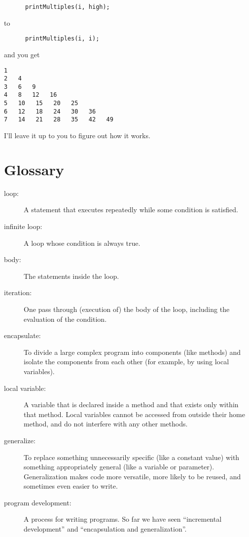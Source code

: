 \documentclass[12pt]{book}
\theoremstyle{definition}
\begin{document}
\begin{lstlisting}
      printMultiples(i, high);
\end{lstlisting}
%
to

\begin{lstlisting}
      printMultiples(i, i);
\end{lstlisting}
%
and you get

\begin{lstlisting}
1   
2   4   
3   6   9   
4   8   12   16   
5   10   15   20   25   
6   12   18   24   30   36   
7   14   21   28   35   42   49  
\end{lstlisting}
%
I'll leave it up to you to figure out how it works.


\section{Glossary}

\begin{description}

\item[loop:]  A statement that executes repeatedly while
some condition is satisfied.

\item[infinite loop:]  A loop whose condition is always true.

\item[body:]  The statements inside the loop.

\item[iteration:]  One pass through (execution of) the body
of the loop, including the evaluation of the condition.

\item[encapsulate:]  To divide a large complex program into
components (like methods) and isolate the components from
each other (for example, by using local variables).

\item[local variable:]  A variable that is declared inside
a method and that exists only within that method.  Local variables
cannot be accessed from outside their home method, and do not
interfere with any other methods.

\item[generalize:]  To replace something unnecessarily specific
(like a constant value) with something appropriately general
(like a variable or parameter).  Generalization makes code more
versatile, more likely to be reused, and sometimes even easier
to write.

\item[program development:] A process for writing programs.
  So far we have seen ``incremental development'' and ``encapsulation
  and generalization''.


\end{description}
\end{document}
